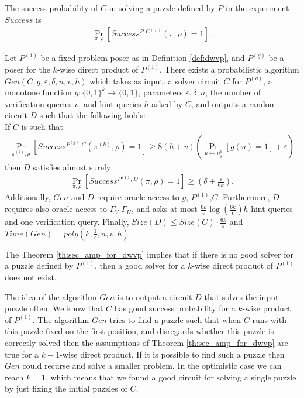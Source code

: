 %
The success probability of $C$ in solving a puzzle defined by $P$ in the experiment $Success$ is
\begin{align}
 \underset{\pi, \rho}{\Pr}[Success^{P,C^{(\cdot, \cdot)}}(\pi, \rho) = 1].
\end{align}
%
\begin{theorem}
\label{th:sec_amp_for_dwvp}
Let $P^{(1)}$ be a fixed problem poser as in Definition \ref{def:dwvp}, and $P^{(g)}$ be a poser for the $k$-wise direct product of $P^{(1)}$.
There exists a probabilistic algorithm $Gen(C, g, \varepsilon, \delta, n, v, h)$ which takes as input: a solver circuit $C$ for $P^{(g)}$,
a monotone function $g:\{0,1\}^k \rightarrow \{0,1\}$, parameters $\varepsilon, \delta,n$,
the number of verification queries $v$, and hint queries $h$ asked by $C$, and outputs a random circuit $D$
such that the following holds: \\
If $C$ is such that \\
  \begin{align*}
    \underset{\pi^{(k)}, \rho}{\Pr}\left[Success^{P^{(g)}, C}(\pi^{(k)}, \rho) = 1\right] \geq 8(h+v)\left(\underset{u \leftarrow \mu_\delta^k}{\Pr}\left[g(u) = 1\right] + \varepsilon\right)
  \end{align*}
then $D$ satisfies almost surely
  \begin{align*}
    \underset{\pi, \rho}{\Pr}\left[Success^{P^{(1)},D}(\pi, \rho) = 1\right] \geq (\delta + \frac{\varepsilon}{6k}).
  \end{align*}
Additionally, $Gen$ and $D$ require oracle access to $g$, $P^{(1)}$,$C$.
Furthermore, $D$ requires also oracle access to $\Gamma_V$ $\Gamma_H$,
and asks at most $\frac{6k}{\epsilon}\log\left(\frac{6k}{\epsilon}\right) h$ hint queries and one verification query.
Finally, $Size(D) \leq Size(C) \cdot \frac{6k}{\varepsilon}$ and $Time(Gen) = poly(k, \frac{1}{\varepsilon}, n, v, h)$.
\end{theorem}
%
The Theorem \ref{th:sec_amp_for_dwvp} implies that if there is no good solver for a puzzle defined by $P^{(1)}$, then a good solver for
a $k$-wise direct product of $P^{(1)}$ does not exist.

The idea of the algorithm $Gen$ is to output a circuit $D$ that solves the input puzzle often.
We know that $C$ has good success probability for a $k$-wise product of $P^{(1)}$.
The algorithm $Gen$ tries to find a puzzle such that when $C$ runs with this puzzle fixed
on the first position, and disregards whether this puzzle is correctly solved
then the assumptions of Theorem \ref{th:sec_amp_for_dwvp} are true for a $k-1$-wise direct product.
If it is possible to find such a puzzle then $Gen$ could recurse and solve a smaller problem.
In the optimistic case we can reach $k=1$, which means that we found a good circuit for solving a single
puzzle by just fixing the initial puzzles of $C$.

